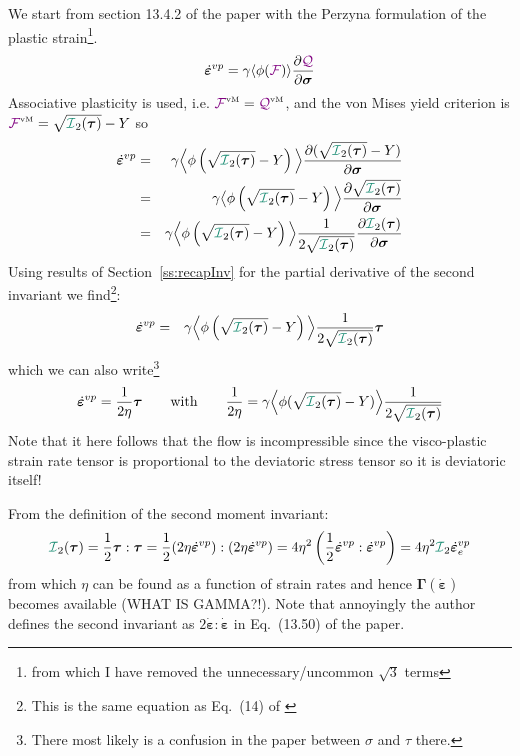 We start from section 13.4.2 of the paper with the Perzyna formulation of the plastic 
strain\footnote{from which I have removed the unnecessary/uncommon $\sqrt 3$ terms}. 
\[
\dot{\bm \varepsilon}^{vp} = \gamma \langle \phi({{\color{violet}\cal F}}) \rangle \frac{\partial {\color{violet}\cal Q}}{\partial \bm\sigma}
\]
Associative plasticity is used, i.e. ${{\color{violet}\cal F}}^{\text{\tiny vM}}={\cal {\color{violet}\cal Q}}^{\text{\tiny vM}}$, and the von Mises yield
criterion is ${\FFF}^{\text{\tiny vM}}=\sqrt{{\III}_2(\bm \tau)}- Y$ so
\begin{eqnarray}
\dot{\bm \varepsilon}^{vp} 
&=& \gamma \Big\langle \phi\left(\sqrt{{\III}_2(\bm \tau)}- Y\right)  \Big\rangle 
\frac{\partial (\sqrt{{\III}_2(\bm \tau)}- Y)}{\partial \bm\sigma} \nn\\
&=& \gamma \big\langle \phi\left(\sqrt{{\III}_2(\bm \tau)}- Y\right)  \Big\rangle 
\frac{\partial \sqrt{{\III}_2(\bm \tau)}}{\partial \bm\sigma} \nn\\
&=& \gamma \Big\langle \phi\left(\sqrt{{\III}_2(\bm \tau)}- Y\right)  \Big\rangle 
\frac{1}{2 \sqrt{{\III}_2(\bm \tau)}} \frac{\partial {\III}_2(\bm \tau)}{\partial \bm\sigma}
\end{eqnarray}
Using results of Section~\ref{ss:recapInv} for the partial derivative of the second invariant
we find\footnote{This is the same equation as Eq.~(14) of 
\textcite{zijo78}}:
\begin{eqnarray}
\dot{\bm \varepsilon}^{vp} 
&=& \gamma \Big\langle \phi\left(\sqrt{{\III}_2(\bm \tau)}- Y \right)  \Big\rangle 
\frac{1}{2 \sqrt{{\III}_2(\bm \tau)}} {\bm \tau}
\end{eqnarray}
which we can also write\footnote{There most likely is a confusion in 
the paper between $\sigma$ and $\tau$ there.}
\[
\dot{\bm \varepsilon}^{vp} =
\frac{1}{2\eta} \bm\tau
\qquad
{\rm with}
\qquad
\frac{1}{2\eta} = \gamma \Big\langle \phi(\sqrt{{\III}_2(\bm \tau)}- Y) \Big\rangle 
\frac{1}{2 \sqrt{{\III}_2(\bm \tau)}}
\]
Note that it here follows that the flow is incompressible since 
the visco-plastic strain rate tensor is proportional to the deviatoric stress tensor
so it is deviatoric itself!


From the definition of the second moment invariant:
\[
{\III}_2(\bm\tau)
=\frac12 \bm\tau:\bm\tau 
=\frac12 (2\eta \dot{\bm \varepsilon}^{vp}):(2\eta \dot{\bm \varepsilon}^{vp})
=4 \eta^2   \left(\frac12 \dot{\bm \varepsilon}^{vp}: \dot{\bm \varepsilon}^{vp}\right)
=4\eta^2 {\III}_2  \dot{\bm \varepsilon}^{vp}_e
\]
from which $\eta$ can be found as a function of strain rates and 
hence $\bm\Gamma(\dot{\bm\varepsilon})$ becomes available (WHAT IS GAMMA?!).
Note that annoyingly the author defines the second invariant as 
$2 \dot{\bm\varepsilon}:\dot{\bm\varepsilon}$ in Eq.~(13.50) of the paper.

